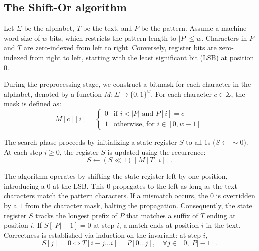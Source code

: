 \subsection{The Shift-Or algorithm}

Let $\Sigma$ be the alphabet, $T$ be the text, and $P$ be the pattern. Assume a machine word size of $w$ bits, which restricts the pattern length to $|P| \leq w$. Characters in $P$ and $T$ are zero-indexed from left to right. Conversely, register bits are zero-indexed from right to left, starting with the least significant bit (LSB) at position $0$.

During the preprocessing stage, we construct a bitmask for each character in the alphabet, denoted by a function $M: \Sigma \to \{0,1\}^w$. For each character $c \in \Sigma$, the mask is defined as:
\begin{equation}
  M[c][i] =
  \begin{cases}
    0 & \text{if } i < |P| \text{ and } P[i] = c \\
    1 & \text{otherwise, for } i \in [0, w-1]
  \end{cases}
\end{equation}

The search phase proceeds by initializing a state register $S$ to all 1s ($S \gets \sim\!\! 0$). At each step $i \geq 0$, the register $S$ is updated using the recurrence:
\begin{equation}
  S \gets (S \ll 1) \mid M[T[i]].
\end{equation}

The algorithm operates by shifting the state register left by one position, introducing a $0$ at the LSB. This $0$ propagates to the left as long as the text characters match the pattern characters. If a mismatch occurs, the $0$ is overridden by a $1$ from the character mask, halting the propagation. Consequently, the state register $S$ tracks the longest prefix of $P$ that matches a suffix of $T$ ending at position $i$. If $S[|P|-1] = 0$ at step $i$, a match ends at position $i$ in the text. Correctness is established via induction on the invariant: at step $i$,
\begin{equation}
  S[j] = 0 \iff T[i-j \dots i] = P[0 \dots j], \quad \forall j \in [0, |P|-1].
\end{equation}

